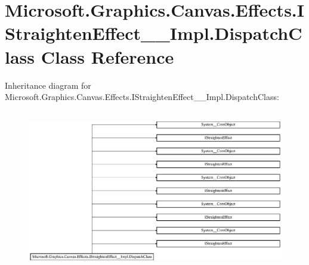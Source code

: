 \hypertarget{class_microsoft_1_1_graphics_1_1_canvas_1_1_effects_1_1_i_straighten_effect_____impl_1_1_dispatch_class}{}\section{Microsoft.\+Graphics.\+Canvas.\+Effects.\+I\+Straighten\+Effect\+\_\+\+\_\+\+Impl.\+Dispatch\+Class Class Reference}
\label{class_microsoft_1_1_graphics_1_1_canvas_1_1_effects_1_1_i_straighten_effect_____impl_1_1_dispatch_class}
Inheritance diagram for Microsoft.\+Graphics.\+Canvas.\+Effects.\+I\+Straighten\+Effect\+\_\+\+\_\+\+Impl.\+Dispatch\+Class\+:\begin{figure}[H]
\begin{center}
\leavevmode
\includegraphics[height=7.080460cm]{class_microsoft_1_1_graphics_1_1_canvas_1_1_effects_1_1_i_straighten_effect_____impl_1_1_dispatch_class}
\end{center}
\end{figure}
